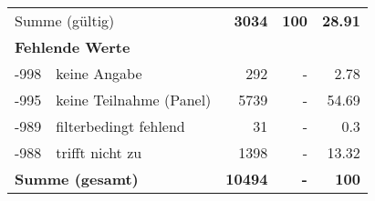 \begin{longtable}{lXrrr}
     \midrule
     \multicolumn{2}{l}{Summe (gültig)} &
       \textbf{\num{3034}} &
     \textbf{\num{100}} &
       \textbf{\num[round-mode=places,round-precision=2]{28.91}} \\
     \multicolumn{5}{l}{\textbf{Fehlende Werte}}\\
       -998 &
       keine Angabe &
         \num{292} &
        - &
         \num[round-mode=places,round-precision=2]{2.78} \\
       -995 &
       keine Teilnahme (Panel) &
         \num{5739} &
        - &
         \num[round-mode=places,round-precision=2]{54.69} \\
       -989 &
       filterbedingt fehlend &
         \num{31} &
        - &
         \num[round-mode=places,round-precision=2]{0.3} \\
       -988 &
       trifft nicht zu &
         \num{1398} &
        - &
         \num[round-mode=places,round-precision=2]{13.32} \\
     \midrule
     \multicolumn{2}{l}{\textbf{Summe (gesamt)}} &
          \textbf{\num{10494}} &
        \textbf{-} &
        \textbf{\num{100}} \\
     \bottomrule
     \end{longtable}
     
